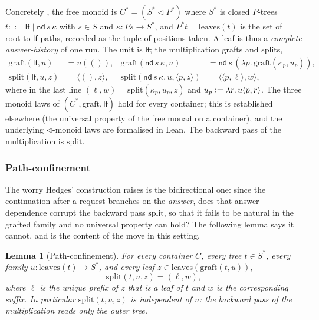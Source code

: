 \documentclass[11pt,reqno]{amsart}
\theoremstyle{plain}
\newtheorem{lemma}[theorem]{Lemma}
\theoremstyle{definition}
\newcommand{\leaves}{\mathrm{leaves}}
\newcommand{\graft}{\mathrm{graft}}
\newcommand{\spl}{\mathrm{split}}
\newcommand{\lf}{\mathsf{lf}}
\newcommand{\nd}{\mathsf{nd}}
\newcommand{\defeq}{\mathrel{\vcentcolon=}}
\begin{document}
Concretely \cite{GambinoKock2013}, the free monoid is $C^{*} = (S^{*} \triangleleft P^{*})$ where
$S^{*}$ is closed $P$-trees $t ::= \lf \mid \nd\, s\, \kappa$ with $s \in S$ and
$\kappa : P s \to S^{*}$, and $P^{*} t = \leaves(t)$ is the set of root-to-$\lf$ paths, recorded as the
tuple of positions taken. A leaf is thus a \emph{complete answer-history} of one run. The unit is
$\lf$; the multiplication grafts and splits,
\begin{align*}
  \graft(\lf,u) &= u(()), & \graft(\nd\, s\, \kappa, u) &= \nd\, s\,(\lambda p.\,\graft(\kappa_p, u_p)),\\
  \spl(\lf,u,z) &= \langle (), z\rangle, &
  \spl(\nd\, s\, \kappa, u, \langle p, z\rangle) &= \big\langle \langle p, \ell\rangle, w\big\rangle,
\end{align*}
where in the last line $(\ell,w) = \spl(\kappa_p, u_p, z)$ and $u_p \defeq \lambda r.\,u\langle p,r\rangle$.
The three monoid laws of $(C^{*},\graft,\lf)$ hold for every container; this is established elsewhere
(the universal property of the free monad on a container), and the underlying $\triangleleft$-monoid laws
are formalised in Lean. The backward pass of the multiplication is $\spl$.

\subsubsection{Path-confinement}
The worry Hedges' construction raises is the bidirectional one: since the continuation after a request
branches on the \emph{answer}, does that answer-dependence corrupt the backward pass $\spl$, so that it
fails to be natural in the grafted family and no universal property can hold? The following lemma says it
cannot, and is the content of the move in this setting.

\begin{lemma}[Path-confinement]\label{lem:D1}
For every container $C$, every tree $t \in S^{*}$, every family $u : \leaves(t) \to S^{*}$, and every
leaf $z \in \leaves(\graft(t,u))$,
\[
  \spl(t,u,z) = (\ell, w),
\]
where $\ell$ is the \emph{unique prefix of $z$ that is a leaf of $t$} and $w$ is the corresponding
suffix. In particular $\spl(t,u,z)$ is independent of $u$: the backward pass of the multiplication reads
only the outer tree.
\end{lemma}
\end{document}
